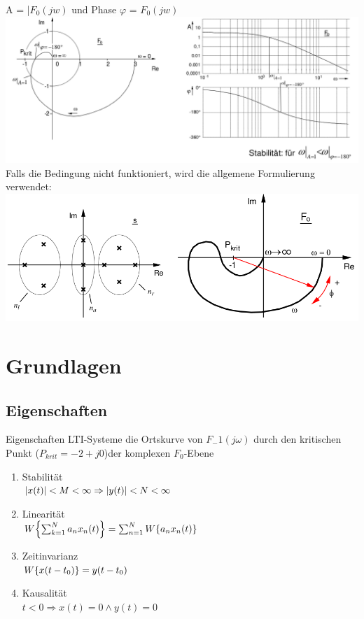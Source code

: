 \documentclass[10pt,a4paper]{article}
\begin{document}
    A = |$F_0 (jw)$ und Phase $\varphi$ = $F_0(jw)$\\
    \includegraphics[width=.5\textwidth]{Figures/Nyquist_Bode.png}
    Falls die Bedingung nicht funktioniert, wird die allgemene Formulierung verwendet:\\
    \includegraphics[width=.5\textwidth]{Figures/Allgemein_Nyquist.png}

\section{Grundlagen}
  \subsection{Eigenschaften}
  Eigenschaften LTI-Systeme die Ortskurve von $F_-1 (j\omega)$ durch den kritischen
  Punkt ($P_{krit} = -2+j0$)der komplexen $F_0$-Ebene
  \begin{mdframed}[style=exercise]
    \begin{enumerate}
      \item Stabilität\\
      $\abs{x(t)} < M < \infty \Rightarrow \abs{y(t)} < N < \infty$
      \item Linearität\\
      $W\qty{\sum_{k=1}^{N}a_n x_n(t)}=\sum_{n=1}^{N}W\qty{a_n x_n(t)}$
      \item Zeitinvarianz\\
      $W\qty{x(t-t_0)} =y(t-t_0)$
      \item Kausalität\\
      $t < 0 \Rightarrow x(t)=0 \land y(t)=0$
    \end{enumerate}
  \end{mdframed}
\end{document}
